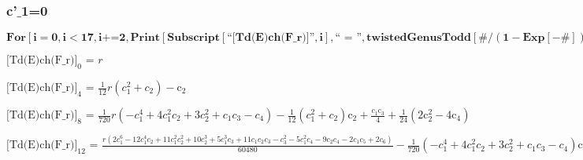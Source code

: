 \documentclass{article}
\newcommand{\unicode}[1]{{}}
\begin{document}
\subsubsection*{c{'}$\_$1=0}

\begin{doublespace}
\noindent\(\pmb{\text{For}\left[i=0,i<17,i\text{+=}2, \text{Print}\left[\text{Subscript}[\text{{``}[Td(E)ch(F$\_$r)]{''}},i],\text{{``} = {''}},\text{twistedGenusTodd}[\#/(1-\text{Exp}[-\#])\&,i]\text{/.}\text{c$\unicode{02bc}$}_1\to
0\right]\right]}\)
\end{doublespace}

\noindent\(\text{[Td(E)ch(F$\_$r)]}_0\text{ = }r\)

\noindent\(\text{[Td(E)ch(F$\_$r)]}_4\text{ = }\frac{1}{12} r \left(c_1^2+c_2\right)-\text{c$\unicode{02bc}$}_2\)

\noindent\(\text{[Td(E)ch(F$\_$r)]}_8\text{ = }\frac{1}{720} r \left(-c_1^4+4 c_1^2 c_2+3 c_2^2+c_1 c_3-c_4\right)-\frac{1}{12} \left(c_1^2+c_2\right)
\text{c$\unicode{02bc}$}_2+\frac{c_1 \text{c$\unicode{02bc}$}_3}{4}+\frac{1}{24} \left(2 \text{c$\unicode{02bc}$}_2^2-4 \text{c$\unicode{02bc}$}_4\right)\)

\noindent\(\text{[Td(E)ch(F$\_$r)]}_{12}\text{ = }\frac{r \left(2 c_1^6-12 c_1^4 c_2+11 c_1^2 c_2^2+10 c_2^3+5 c_1^3 c_3+11 c_1 c_2 c_3-c_3^2-5 c_1^2
c_4-9 c_2 c_4-2 c_1 c_5+2 c_6\right)}{60480}-\frac{1}{720} \left(-c_1^4+4 c_1^2 c_2+3 c_2^2+c_1 c_3-c_4\right) \text{c$\unicode{02bc}$}_2+\frac{1}{48}
c_1 c_2 \text{c$\unicode{02bc}$}_3+\frac{1}{288} \left(c_1^2+c_2\right) \left(2 \text{c$\unicode{02bc}$}_2^2-4 \text{c$\unicode{02bc}$}_4\right)+\frac{1}{240}
c_1 \left(-5 \text{c$\unicode{02bc}$}_2 \text{c$\unicode{02bc}$}_3+5 \text{c$\unicode{02bc}$}_5\right)+\frac{1}{720} \left(-2 \text{c$\unicode{02bc}$}_2^3+3
\text{c$\unicode{02bc}$}_3^2+6 \text{c$\unicode{02bc}$}_2 \text{c$\unicode{02bc}$}_4-6 \text{c$\unicode{02bc}$}_6\right)\)
\end{document}
